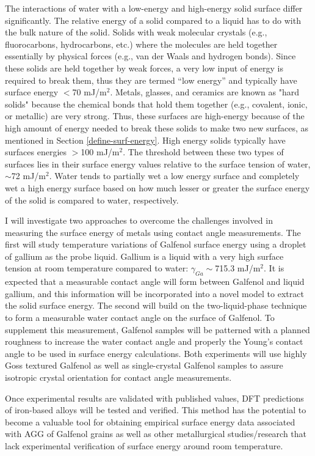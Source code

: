 
The interactions of water with a low-energy and high-energy solid surface differ significantly. The relative energy of a solid compared to a liquid has to do with the bulk nature of the solid. Solids with weak molecular crystals (e.g., fluorocarbons, hydrocarbons, etc.) where the molecules are held together essentially by physical forces (e.g., van der Waals and hydrogen bonds). Since these solids are held together by weak forces, a very low input of energy is required to break them, thus they are termed “low energy” and typically have surface energy $<$70 mJ/m$^2$.  Metals, glasses, and ceramics are known as "hard solids" because the chemical bonds that hold them together (e.g., covalent, ionic, or metallic) are very strong. Thus, these surfaces are high-energy because of the high amount of energy needed to break these solids to make two new surfaces, as mentioned in Section \ref{define-surf-energy}. High energy solids typically have surfaces energies $>$100 mJ/m$^2$.  The threshold between these two types of surfaces lies in their surface energy values relative to the surface tension of water, $\sim$72 mJ/m$^2$. Water tends to partially wet a low energy surface and completely wet a high energy surface based on how much lesser or greater the surface energy of the solid is compared to water, respectively. 

I will investigate two approaches to overcome the challenges involved in measuring the surface energy of metals using contact angle measurements. The first will study temperature variations of Galfenol surface energy using a droplet of gallium as the probe liquid. Gallium is a liquid with a very high surface tension at room temperature compared to water: $\gamma_{Ga}\sim$715.3 mJ/m$^2$. It is expected that a measurable contact angle will form between Galfenol and liquid gallium, and this information will be incorporated into a novel model to extract the solid surface energy. The second will build on the two-liquid-phase technique to form a measurable water contact angle on the surface of Galfenol. To supplement this measurement, Galfenol samples will be patterned with a planned roughness to increase the water contact angle and properly the Young's contact angle to be used in surface energy calculations. Both experiments will use highly Goss textured Galfenol as well as single-crystal Galfenol samples to assure isotropic crystal orientation for contact angle measurements. 

Once experimental results are validated with published values, DFT predictions of iron-based alloys will be tested and verified. This method has the potential to become a valuable tool for obtaining empirical surface energy data associated with AGG of Galfenol grains as well as other metallurgical studies/research that lack experimental verification of surface energy around room temperature. 



